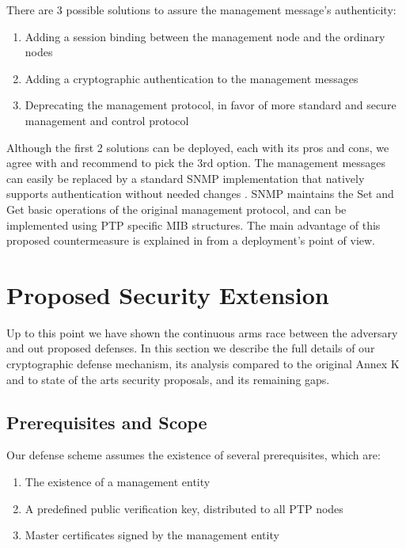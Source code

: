 \documentclass[11pt]{article}
\begin{document}
There are 3 possible solutions to assure the management message's authenticity:

\begin{enumerate}

  \item Adding a session binding between the management node and the ordinary nodes

  \item Adding a cryptographic authentication to the management messages

  \item Deprecating the management protocol, in favor of more standard and secure management and control protocol

\end{enumerate}

Although the first 2 solutions can be deployed, each with its pros and cons, we agree with \cite{PTP_Deploy} and recommend to pick the 3rd option. The management messages can easily be replaced by a standard SNMP implementation that natively supports authentication without needed changes \cite{SNMPv3}. SNMP maintains the Set and Get basic operations of the original management protocol, and can be implemented using PTP specific MIB structures. The main advantage of this proposed countermeasure is explained in \cite{PTP_Deploy} from a deployment's point of view.





\section{Proposed Security Extension}\label{Solution}



Up to this point we have shown the continuous arms race between the adversary and out proposed defenses. In this section we describe the full details of our cryptographic defense mechanism, its analysis compared to the original Annex K and to state of the arts security proposals, and its remaining gaps.



\subsection{Prerequisites and Scope}\label{overview:pre}

Our defense scheme assumes the existence of several prerequisites, which are:

\begin{enumerate}

  \item The existence of a management entity

  \item A predefined public verification key, distributed to all PTP nodes

  \item Master certificates signed by the management entity

\end{enumerate}
\end{document}
